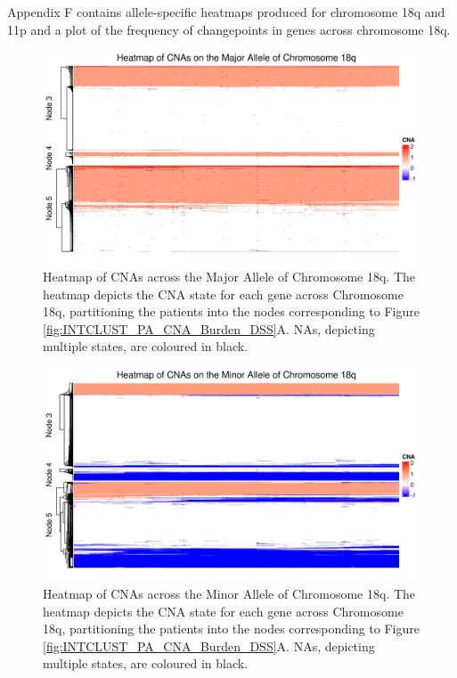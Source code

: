 {}


Appendix F contains allele-specific heatmaps produced for chromosome 18q and 11p and a plot of the frequency of changepoints in genes across chromosome 18q.

\vfill
\begin{figure}[!htb]
\centering
\includegraphics[width = 1\textwidth]{../figures/Chapter_6/Heatmap_Chr18q_Genes_Major.png}
\caption[Heatmap of CNAs across the Major Allele of Chromosome 18q.]{Heatmap of CNAs across the Major Allele of Chromosome 18q. The heatmap depicts the CNA state for each gene across Chromosome 18q, partitioning the patients into the nodes corresponding to Figure \ref{fig:INTCLUST_PA_CNA_Burden_DSS}A. NAs, depicting multiple states, are coloured in black.}
\label{fig:heatmap_Major_18q}
\end{figure}
\vfill 

\begin{figure}[!htb]
\centering
\includegraphics[width = 1\textwidth]{../figures/Chapter_6/Heatmap_Chr18q_Genes_Minor.png}
\caption[Heatmap of CNAs across the Minor Allele of Chromosome 18q.]{Heatmap of CNAs across the Minor Allele of Chromosome 18q. The heatmap depicts the CNA state for each gene across Chromosome 18q, partitioning the patients into the nodes corresponding to Figure \ref{fig:INTCLUST_PA_CNA_Burden_DSS}A. NAs, depicting multiple states, are coloured in black.}
\label{fig:heatmap_Minor_18q}
\end{figure}

